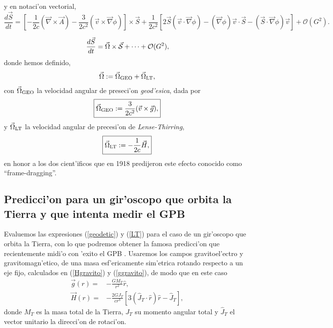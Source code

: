 y en notaci'on vectorial,
\begin{equation}\boxed{
\frac{d\vec{S}}{dt} = \left[-\frac{1}{2c}(\vec{\nabla}\times\vec{A})-\frac{3}{2c^2}(\vec{v}\times\vec{\nabla}\phi)\right]\times\vec{S} 
+\frac{1}{2c^2}\left[2\vec{S}(\vec{v}\cdot\vec{\nabla}\phi)-(\vec{\nabla}\phi)\vec{v}\cdot\vec{S}
-(\vec{S}\cdot\vec\nabla\phi)\vec{v}\right]+\mathcal{O}(G^2).}
\end{equation}

\begin{equation}
\frac{d\vec{S}}{dt}=\vec{\Omega}\times\vec{{\cal S}}+\cdots + \mathcal{O}(G^2),
\end{equation}
donde hemos definido,
\begin{equation}
\vec{\Omega}:=\vec{\Omega}_{\rm GEO}+\vec{\Omega}_{\rm LT},
\end{equation}
con $\vec{\Omega}_{\rm GEO}$ la velocidad angular de preseci'on \emph{geod'esica}, dada por
\begin{align}\boxed{
\vec{\Omega}_{\rm GEO}:=\frac{3}{2c^2}(\vec{v}\times\vec{g}),}\label{geodetic}
\end{align}
y $\vec{\Omega}_{\rm LT}$ la velocidad angular de precesi'on de \emph{Lense-Thirring}, 
\begin{align}\boxed{
\vec{\Omega}_{\rm LT}:=-\frac{1}{2c}\vec{H},}\label{LT}
\end{align}
en honor a los dos cient'ificos que en 1918 predijeron este efecto conocido como ``frame-dragging''.


\subsection{Predicci'on para un gir'oscopo que orbita la Tierra y que intenta medir el GPB}

Evaluemos las expresiones (\ref{geodetic}) y (\ref{LT}) para el caso de un gir'oscopo que orbita la Tierra, con lo que podremos obtener la famosa predicci'on que recientemente midi'o con 'exito el GPB \cite{Everitt11}. Usaremos los campos gravitoel'ectro y gravitomagn'etico, de una masa esf'ericamente sim'etrica rotando respecto a un eje fijo, calculados en (\ref{Hgravito}) y (\ref{ggravito}), de modo que en este caso
\begin{align}
\vec{g}(r)={}&-\frac{GM_T}{r^2}\hat{r},\label{gGPB}\\
\vec{H}(r)={}&-\frac{2GJ_T}{cr^3}\left[3(\hat{J}_T\cdot\hat{r})\hat{r}-\hat{J}_T\right]\label{BGPB},
\end{align}
donde $M_T$ es la masa total de la Tierra, $J_T$ su momento angular total y $\hat{J}_T$ el vector unitario la direcci'on de rotaci'on.

